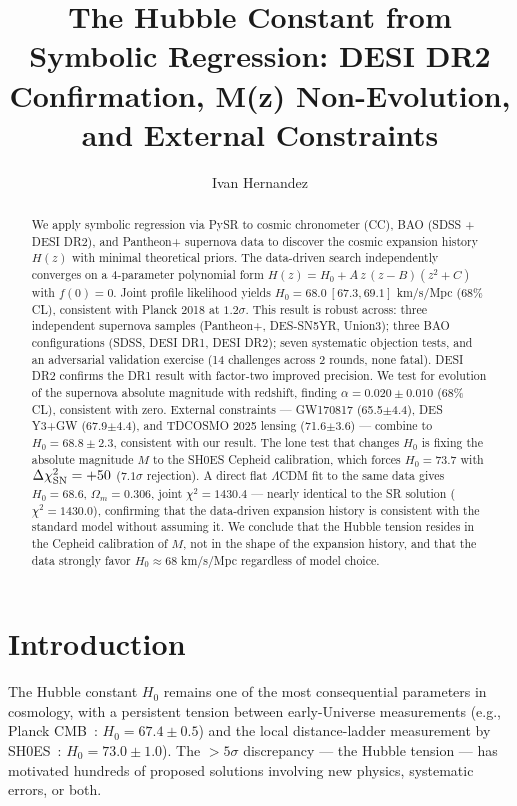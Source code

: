 \documentclass[twocolumn]{aastex631}
\begin{document}
\title{The Hubble Constant from Symbolic Regression: DESI DR2 Confirmation,
M(z) Non-Evolution, and External Constraints}

\author{Ivan Hernandez}

\begin{abstract}
We apply symbolic regression via PySR to cosmic chronometer (CC), BAO (SDSS +
DESI DR2), and Pantheon+ supernova data to discover the cosmic expansion
history $H(z)$ with minimal theoretical priors.  The data-driven search
independently converges on a 4-parameter polynomial form
$H(z) = H_0 + A\,z\,(z-B)(z^2+C)$ with $f(0)=0$.  Joint profile likelihood
yields $H_0 = 68.0\ [67.3, 69.1]$ km/s/Mpc (68\% CL), consistent with Planck 2018 at
$1.2\sigma$.  This result is robust
across: three independent supernova samples (Pantheon+, DES-SN5YR, Union3);
three BAO configurations (SDSS, DESI DR1, DESI DR2); seven systematic
objection tests, and an adversarial validation exercise (14 challenges across
2 rounds, none fatal).  DESI DR2 confirms the DR1 result with
factor-two improved precision.
We test for evolution of the supernova absolute magnitude with redshift,
finding $\alpha = 0.020 \pm 0.010$ (68\% CL), consistent with zero.
External constraints --- GW170817 (65.5$\pm$4.4), DES Y3+GW (67.9$\pm$4.4),
and TDCOSMO 2025 lensing (71.6$\pm$3.6) --- combine to $H_0=68.8\pm2.3$,
consistent with our result.  The lone test that changes $H_0$ is fixing the
absolute magnitude $M$ to the SH0ES Cepheid calibration, which forces
$H_0=73.7$ with $\Delta\chi^2_{\rm SN}=+50$ ($7.1\sigma$ rejection).
A direct flat $\Lambda$CDM fit to the same data gives $H_0=68.6$,
$\Omega_m=0.306$, joint
$\chi^2=1430.4$ --- nearly identical to the SR solution ($\chi^2=1430.0$),
confirming that the data-driven expansion history is consistent with the
standard model without assuming it.  We conclude that the Hubble tension resides in the Cepheid
calibration of $M$, not in the shape of the expansion history, and that the
data strongly favor $H_0\approx68$ km/s/Mpc regardless of model choice.
\end{abstract}

\section{Introduction}

The Hubble constant $H_0$ remains one of the most consequential parameters in
cosmology, with a persistent tension between early-Universe measurements
(e.g., Planck CMB~\cite{planck2018}: $H_0 = 67.4 \pm 0.5$) and the local
distance-ladder measurement by SH0ES~\cite{sh0es2024}: $H_0 = 73.0 \pm 1.0$).
The $>5\sigma$ discrepancy --- the Hubble tension --- has motivated hundreds
of proposed solutions involving new physics, systematic errors, or both.
\end{document}
